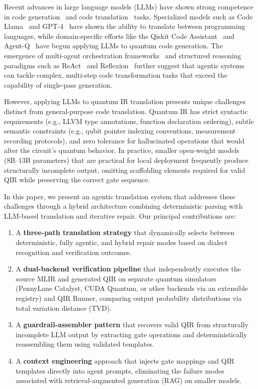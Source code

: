 \documentclass[conference]{IEEEtran}
\begin{document}
Recent advances in large language models (LLMs) have shown strong competence in code generation~\cite{chen2021codex, li2022alphacode} and code translation~\cite{szafraniec2023code} tasks. Specialized models such as Code Llama~\cite{roziere2023codellama} and GPT-4~\cite{achiam2023gpt4} have shown the ability to translate between programming languages, while domain-specific efforts like the Qiskit Code Assistant~\cite{dupuis2024qiskitassistant} and Agent-Q~\cite{jern2025agentq} have begun applying LLMs to quantum code generation. The emergence of multi-agent orchestration frameworks~\cite{hong2024crewai, wu2023autogen} and structured reasoning paradigms such as ReAct~\cite{yao2023react} and Reflexion~\cite{shinn2023reflexion} further suggest that agentic systems can tackle complex, multi-step code transformation tasks that exceed the capability of single-pass generation.

However, applying LLMs to quantum IR translation presents unique challenges distinct from general-purpose code translation. Quantum IR has strict syntactic requirements (e.g., LLVM type annotations, function declaration ordering), subtle semantic constraints (e.g., qubit pointer indexing conventions, measurement recording protocols), and zero tolerance for hallucinated operations that would alter the circuit's quantum behavior. In practice, smaller open-weight models (8B--13B parameters) that are practical for local deployment frequently produce structurally incomplete output, omitting scaffolding elements required for valid QIR while preserving the correct gate sequence.

In this paper, we present an agentic translation system that addresses these challenges through a hybrid architecture combining deterministic parsing with LLM-based translation and iterative repair. Our principal contributions are:

\begin{enumerate}
    \item A \textbf{three-path translation strategy} that dynamically selects between deterministic, fully agentic, and hybrid repair modes based on dialect recognition and verification outcomes.
    \item A \textbf{dual-backend verification pipeline} that independently executes the source MLIR and generated QIR on separate quantum simulators (PennyLane Catalyst, CUDA Quantum, or other backends via an extensible registry) and QIR Runner, comparing output probability distributions via total variation distance (TVD).
    \item A \textbf{guardrail-assembler pattern} that recovers valid QIR from structurally incomplete LLM output by extracting gate operations and deterministically reassembling them using validated templates.
    \item A \textbf{context engineering} approach that injects gate mappings and QIR templates directly into agent prompts, eliminating the failure modes associated with retrieval-augmented generation (RAG) on smaller models.
\end{enumerate}
\end{document}
